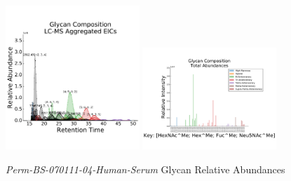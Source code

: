     \begin{figure}[!htbp]
        \centering
        \includegraphics[width=0.45\textwidth,valign=t]{figure/rp_human_serum_chromatograms.pdf}
        \includegraphics[width=0.45\textwidth,valign=t]{figure/rp_human_serum_abundances.pdf}
        \caption{\textit{Perm-BS-070111-04-Human-Serum} Glycan Relative Abundances}
        \label{fig:rp_human_serum_aggregated_eics}
    \end{figure}


